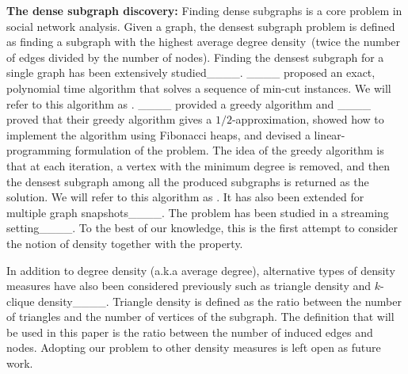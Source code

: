 \textbf{The dense subgraph discovery:}
Finding dense subgraphs is a core problem in social network analysis. 
Given a graph, the densest subgraph problem is defined as finding a subgraph with the highest average degree density~(twice the number of edges divided by the number of nodes).
Finding the densest subgraph for a single graph has been extensively studied____.
____ proposed an exact,
polynomial time algorithm that solves a sequence of min-cut instances. We will refer to this algorithm as \algdg. ____ provided a greedy algorithm and 
 ____ proved that their greedy algorithm gives a $1/2$-approximation, showed how to implement the algorithm using Fibonacci heaps, and devised a linear-programming formulation of the problem. The idea of the greedy algorithm is that at each iteration, a vertex with the minimum degree is removed, and then the densest
subgraph among all the produced subgraphs is returned as the solution. We will refer to this algorithm as \algdc. It has also been extended for multiple graph snapshots____. The problem has been studied in a streaming setting____. 
To the best of our knowledge, this is the first attempt to consider the notion of density together with the \stc property.

In addition to degree density (a.k.a average degree), alternative types of density measures have also been considered previously such as triangle density and $k$-clique density____.
Triangle density is defined as the ratio between the number of triangles and the number of vertices of the subgraph.
The definition that will be used in this paper is the ratio between the number of induced edges and nodes.
Adopting our problem to other density measures is left open as future work.